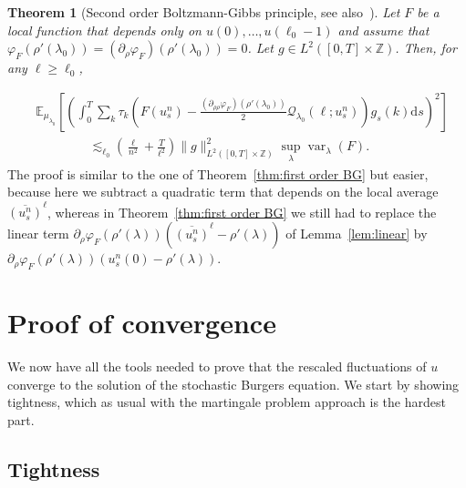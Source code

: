 \documentclass[11pt, a4paper]{article}
\newcommand{\mathd}{\mathrm{d}}
\newcommand{\tmop}[1]{\ensuremath{\operatorname{#1}}}
\newtheorem{theorem}{Theorem}[section]
\newcommand{\CQ}{\mathscr{Q}}
\newcommand{\1}{\mathbf{1}}
\begin{document}
\begin{theorem}[Second order Boltzmann-Gibbs principle, see also~{\cite[Theorem~7]{bib:goncalvesJara}}]
  \label{thm:second order BG}  
  Let $F$ be a local function that depends only on $u (0), \ldots, u (\ell_0 -
  1)$ and assume that $\varphi_F (\rho' (\lambda_0)) = (\partial_{\rho}
  \varphi_F) (\rho' (\lambda_0)) = 0$. Let $g \in L^2 ([0, T] \times
  \mathbb{Z})$. Then, for any $\ell \geqslant \ell_0$,
\end{theorem}
\begin{align*}
   &\mathbb{E}_{{\mu}_{\lambda_0}} \left[ \left( \int_0^T \sum_k \tau_k
   \left( F (u^n_s) - \frac{(\partial_{\rho \rho} \varphi_F) (\rho'
   (\lambda_0))}{2} \CQ_{\lambda_0} (\ell ; u^n_s) \right) g_s (k) \mathd s
   \right)^2 \right] \\
   & \hspace{50pt} \lesssim_{\ell_0} \left( \frac{\ell}{n^2} + \frac{T}{\ell^2} \right) \| g
   \|_{L^2 ([0, T] \times \mathbb{Z})}^2 \sup_{\lambda} \tmop{var}_{\lambda}
   (F) .
\end{align*}
The proof is similar to the one of Theorem~\ref{thm:first order BG} but
easier, because here we subtract a quadratic term that depends on the local
average $\overline{(u^n_s)}^{\ell}$, whereas in Theorem~\ref{thm:first order
BG} we still had to replace the linear term $\partial_{\rho} \varphi_F (\rho'
(\lambda)) (\overline{(u^n_s)}^{\ell} - \rho' (\lambda))$ of
Lemma~\ref{lem:linear} by $\partial_{\rho} \varphi_F (\rho' (\lambda)) (u_s^n
(0) - \rho' (\lambda))$.

\section{Proof of convergence}\label{sec:convergence}

We now have all the tools needed to prove that the rescaled fluctuations of $u$ converge to the solution of the stochastic Burgers equation. We start by showing tightness, which as usual with the martingale problem approach is the hardest part.

\subsection{Tightness}\label{sec:tightness}
\end{document}
